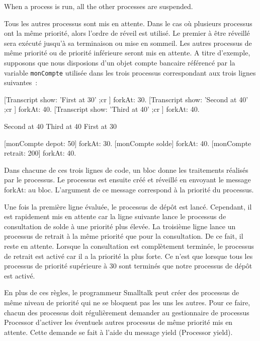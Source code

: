 \documentclass[a4paper,10pt,twoside]{book}
\begin{document}
When a process is run, all the other processes are suspended. 


Tous les autres processus sont mis en attente. Dans le cas où plusieurs processus
ont la même priorité, alors l'ordre de réveil est utilisé. Le premier à être réveillé sera exécuté jusqu'à sa terminaison ou mise en sommeil. Les autres processus de même priorité ou de priorité inférieure seront mis en attente.
A titre d'exemple, supposons que nous disposions d'un objet compte bancaire référencé par la variable \verb!monCompte! utilisée dans les trois processus correspondant aux trois lignes suivantes~:

\begin{code}{}
[Transcript show: 'First at 30' ;cr ] forkAt: 30.
[Transcript show: 'Second at 40' ;cr ] forkAt: 40.
[Transcript show: 'Third at 40' ;cr ] forkAt: 40.
\end{code}

\begin{code}{}
Second at 40
Third at 40
First at 30
\end{code}

[monCompte depot: 50] forkAt: 30.
[monCompte solde] forkAt: 40.
[monCompte retrait: 200] forkAt: 40.


Dans chacune de ces trois lignes de code, un bloc donne les traitements réalisés par le processus. Le processus est ensuite créé et réveillé en envoyant le message forkAt: au bloc. L'argument de ce message correspond à la
priorité du processus.

Une fois la première ligne évaluée, le processus de dépôt est lancé. Cependant, il est rapidement mis en attente car la ligne suivante lance le processus de consultation de solde à une priorité plus élevée. La troisième ligne lance un processus de retrait à la même priorité que pour la consultation. De ce fait, il reste en attente. Lorsque la
consultation est complètement terminée, le processus de retrait est activé car il a la priorité la plus forte. Ce n'est que lorsque tous les processus de priorité supérieure à 30 sont terminés que notre processus de dépôt est activé.

En plus de ces règles, le programmeur Smalltalk peut créer des processus de même niveau de priorité qui ne se bloquent pas les uns les autres. Pour ce faire, chacun des processus doit régulièrement demander au gestionnaire de processus Processor d'activer les éventuels autres processus de même priorité mis en attente.
Cette demande se fait à l'aide du message yield (Processor yield).
\end{document}
